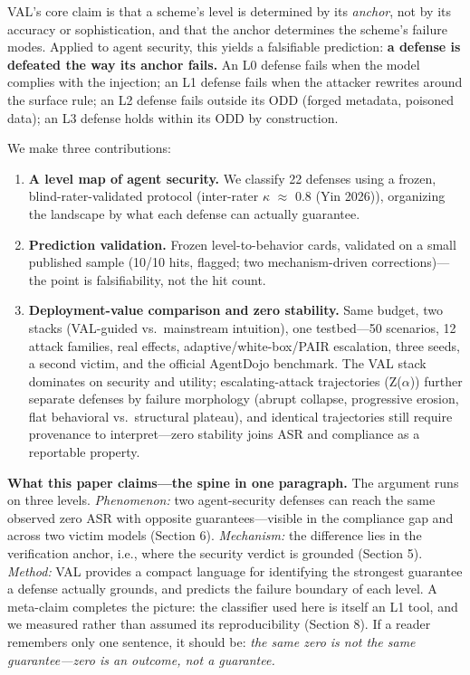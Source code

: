 \documentclass[11pt]{article}
\providecommand{\tightlist}{%

  \setlength{\itemsep}{0pt}\setlength{\parskip}{0pt}}
\begin{document}
VAL's core claim is that a scheme's level is determined by its \emph{anchor}, not by its accuracy or sophistication, and that the anchor determines the scheme's failure modes. Applied to agent security, this yields a falsifiable prediction: \textbf{a defense is defeated the way its anchor fails.} An L0 defense fails when the model complies with the injection; an L1 defense fails when the attacker rewrites around the surface rule; an L2 defense fails outside its ODD (forged metadata, poisoned data); an L3 defense holds within its ODD by construction.

We make three contributions:

\begin{enumerate}

\def\labelenumi{\arabic{enumi}.}

\tightlist

\item

  \textbf{A level map of agent security.} We classify 22 defenses using a frozen, blind-rater-validated protocol (inter-rater $\kappa$ $\approx$ 0.8 (Yin 2026)), organizing the landscape by what each defense can actually guarantee.

\item

  \textbf{Prediction validation.} Frozen level-to-behavior cards, validated on a small published sample (10/10 hits, flagged; two mechanism-driven corrections)---the point is falsifiability, not the hit count.

\item

  \textbf{Deployment-value comparison and zero stability.} Same budget, two stacks (VAL-guided vs.~mainstream intuition), one testbed---50 scenarios, 12 attack families, real effects, adaptive/white-box/PAIR escalation, three seeds, a second victim, and the official AgentDojo benchmark. The VAL stack dominates on security and utility; escalating-attack trajectories (Z($\alpha$)) further separate defenses by failure morphology (abrupt collapse, progressive erosion, flat behavioral vs.~structural plateau), and identical trajectories still require provenance to interpret---zero stability joins ASR and compliance as a reportable property.

\end{enumerate}

\textbf{What this paper claims---the spine in one paragraph.} The argument runs on three levels. \emph{Phenomenon:} two agent-security defenses can reach the same observed zero ASR with opposite guarantees---visible in the compliance gap and across two victim models (Section 6). \emph{Mechanism:} the difference lies in the verification anchor, i.e., where the security verdict is grounded (Section 5). \emph{Method:} VAL provides a compact language for identifying the strongest guarantee a defense actually grounds, and predicts the failure boundary of each level. A meta-claim completes the picture: the classifier used here is itself an L1 tool, and we measured rather than assumed its reproducibility (Section 8). If a reader remembers only one sentence, it should be: \emph{the same zero is not the same guarantee---zero is an outcome, not a guarantee.}
\end{document}
